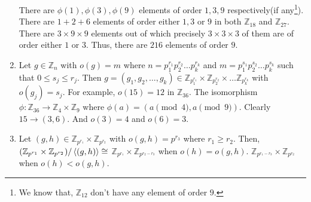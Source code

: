 \begin{enumerate}
	There are $\phi(1),\phi(3),\phi(9)$ elements of order $1,3,9$ respectively(if any\footnote{We know that, $\mathbb{Z}_{12}$ don't have any element of order $9$.}).
	There are $1+2+6$ elements of order either $1,3$ or $9$ in both $\mathbb{Z}_{18}$ and $\mathbb{Z}_{27}$.
	There are $3 \times 9 \times 9$ elements out of which precisely $3 \times 3 \times 3$ of them are of order either $1$ or $3$.
	Thus, there are $216$ elements of order $9$.
	\item Let $g \in \mathbb{Z}_n$ with $o(g) = m$ where $n=p_1^{r_1}p_2^{r_2}\dots p_k^{r_k}$ and $m = p_1^{s_1}p_2^{s_2}\dots p_k^{s_k}$ such that $0 \le s_j \le r_j$.
	Then $g = (g_1,g_2,\dots,g_k) \in \mathbb{Z}_{p_1^{r_1}} \times \mathbb{Z}_{p_2^{r_2}} \times \dots \mathbb{Z}_{p_k^{r_k}}$ with $o(g_j) = s_j$.
		For example, $o(15) = 12$ in $\mathbb{Z}_{36}$. The isomorphism $\phi : \mathbb{Z}_{36} \to \mathbb{Z}_4 \times \mathbb{Z}_9$ where $\phi(a) = (a\pmod{4},a\pmod{9})$.
	Clearly $15 \to (3,6)$. And $o(3) = 4$ and $o(6)=3$.
	\item Let $(g,h) \in \mathbb{Z}_{p^{r_1}} \times \mathbb{Z}_{p^{r_2}}$ with $o(g,h) = p^{r_3}$ where $r_1 \ge r_2$. Then, $(\mathbb{Z}_{p^{r_1}} \times \mathbb{Z}_{p^{r_2}})/\left\langle (g,h) \right\rangle \cong $
		\subitem $\mathbb{Z}_{p^{r_1}} \times \mathbb{Z}_{p^{r_2-r_3}}$ when $o(h) = o(g,h)$.
		\subitem $\mathbb{Z}_{p^{r_1-r_3}} \times \mathbb{Z}_{p^{r_2}}$ when $o(h) < o(g,h)$.


\end{enumerate}

